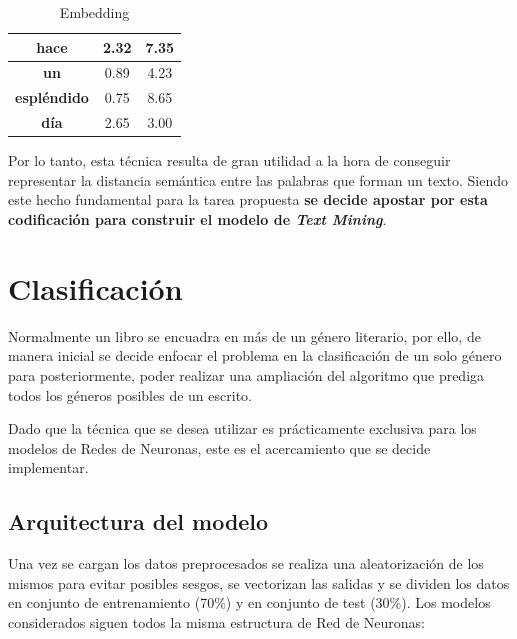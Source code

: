 \documentclass[12pt,a4paper, xcolor=table]{article}
\begin{document}
  \begin{table}[h]
        \centering
        \begin{tabular}{|c|c|c|}
        \hline
        \textbf{hace}                     & 2.32 & 7.35 \\ \hline
        \textbf{un}                       & 0.89 & 4.23 \\ \hline
        \textbf{espléndido}               & 0.75 & 8.65 \\ \hline
        \textbf{día}                      & 2.65 & 3.00 \\ \hline
        \end{tabular}
        \caption{Embedding}
            \label{fig:graf_exp1}
    \end{table}

Por lo tanto, esta técnica resulta de gran utilidad a la hora de conseguir representar la distancia semántica entre las palabras que forman un texto. Siendo este hecho fundamental para la tarea propuesta \textbf{se decide apostar por esta codificación para construir el modelo de \textit{Text Mining}}.

\newpage

\section{Clasificación}

Normalmente un libro se encuadra en más de un género literario, por ello, de manera inicial se decide enfocar el problema en la clasificación de un solo género para posteriormente, poder realizar una ampliación del algoritmo que prediga todos los géneros posibles de un escrito.

\vspace{2mm}

Dado que la técnica que se desea utilizar es prácticamente exclusiva para los modelos de Redes de Neuronas, este es el acercamiento que se decide implementar.

\subsection{Arquitectura del modelo}

Una vez se cargan los datos preprocesados se realiza una aleatorización de los mismos para evitar posibles sesgos, se vectorizan las salidas y se dividen los datos en conjunto de  entrenamiento (70\%) y en conjunto de test (30\%). Los modelos considerados siguen todos la misma estructura de Red de Neuronas:
\end{document}
